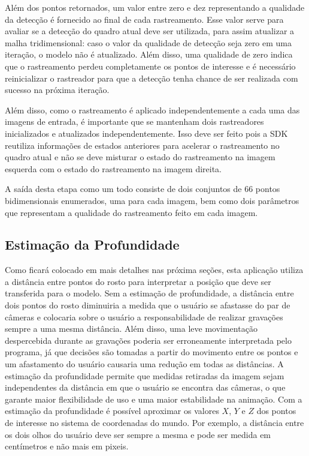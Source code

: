 Além dos pontos retornados, um valor entre zero e dez representando a qualidade da detecção é fornecido ao final de cada rastreamento. Esse valor serve para avaliar se a detecção do quadro atual deve ser utilizada, para assim atualizar a malha tridimensional: caso o valor da qualidade de detecção seja zero em uma iteração, o modelo não é atualizado. Além disso, uma qualidade de zero indica que o rastreamento perdeu completamente os pontos de interesse e é necessário reinicializar o rastreador para que a detecção tenha chance de ser realizada com sucesso na próxima iteração.

Além disso, como o rastreamento é aplicado independentemente a cada uma das imagens de entrada, é importante que se mantenham dois rastreadores inicializados e atualizados independentemente. Isso deve ser feito pois a SDK reutiliza informações de estados anteriores para acelerar o rastreamento no quadro atual e não se deve misturar o estado do rastreamento na imagem esquerda com o estado do rastreamento na imagem direita. 

A saída desta etapa como um todo consiste de dois conjuntos de 66 pontos bidimensionais enumerados, uma para cada imagem, bem como dois parâmetros que representam a qualidade do rastreamento feito em cada imagem. 

\subsection{Estimação da Profundidade}

Como ficará colocado em mais detalhes nas próxima seções, esta aplicação utiliza a distância entre pontos do rosto para interpretar a posição que deve ser transferida para o modelo. Sem a estimação de profundidade, a distância entre dois pontos do rosto diminuiria a medida que o usuário se afastasse do par de câmeras e colocaria sobre o usuário a responsabilidade de realizar gravações sempre a uma mesma distância. Além disso, uma leve movimentação despercebida durante as gravações poderia ser erroneamente interpretada pelo programa, já que decisões são tomadas a partir do movimento entre os pontos e um afastamento do usuário causaria uma redução em todas as distâncias.
A estimação da profundidade permite que medidas retiradas da imagem sejam independentes da distância em que o usuário se encontra das câmeras, o que garante maior flexibilidade de uso e uma maior estabilidade na animação. Com a estimação da profundidade é possível aproximar os valores $X$, $Y$ e $Z$ dos pontos de interesse no sistema de coordenadas do mundo. Por exemplo, a distância entre os dois olhos do usuário deve ser sempre a mesma e pode ser medida em centímetros e não mais em pixeis.

